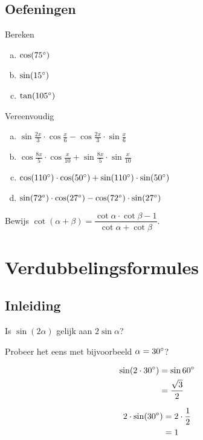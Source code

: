 \documentclass[a4paper,12pt]{article}
\begin{document}
\subsection{Oefeningen}

\begin{oefening}
Bereken
\begin{enumerate}[(a)]
  \item $\cos(75^\circ)$
  \item $\sin(15^\circ)$
  \item $\tan(105^\circ)$
\end{enumerate}
\end{oefening}

\begin{oefening}
Vereenvoudig
\begin{enumerate}[(a)]
  \item $\sin\frac{2x}{3}\cdot \cos\frac{x}{6}-\cos\frac{2x}{3}\cdot \sin\frac{x}{6}$
  \item $\cos\frac{8x}{5}\cdot \cos\frac{x}{10}+\sin\frac{8x}{5}\cdot \sin\frac{x}{10}$
  \item $\cos(110^\circ)\cdot \cos(50^\circ)+\sin(110^\circ)\cdot \sin(50^\circ)$
  \item $\sin(72^\circ)\cdot \cos(27^\circ)-\cos(72^\circ)\cdot \sin(27^\circ)$
\end{enumerate}
\end{oefening}

\begin{oefening}
Bewijs $\displaystyle \cot(\alpha+\beta)=\dfrac{\cot\alpha\cdot\cot\beta-1}{\cot\alpha+\cot\beta}$.
\end{oefening}

\pagebreak
\section{Verdubbelingsformules}

\subsection{Inleiding}
Is $\sin(2\alpha)$ gelijk aan $2\sin\alpha$?

Probeer het eens met bijvoorbeeld $\alpha=30^\circ$?

\begin{minipage}{0.3\textwidth}
\begin{align*}
  \sin(2\cdot30^\circ) &= \sin 60^\circ\\
                        &= \dfrac{\sqrt{3}}{2}
\end{align*}  
\end{minipage}
\begin{minipage}{0.3\textwidth}
\begin{align*}
  2\cdot\sin(30^\circ) &= 2\cdot\dfrac{1}{2}\\
                        &= 1
\end{align*}  
\end{minipage}
\end{document}
